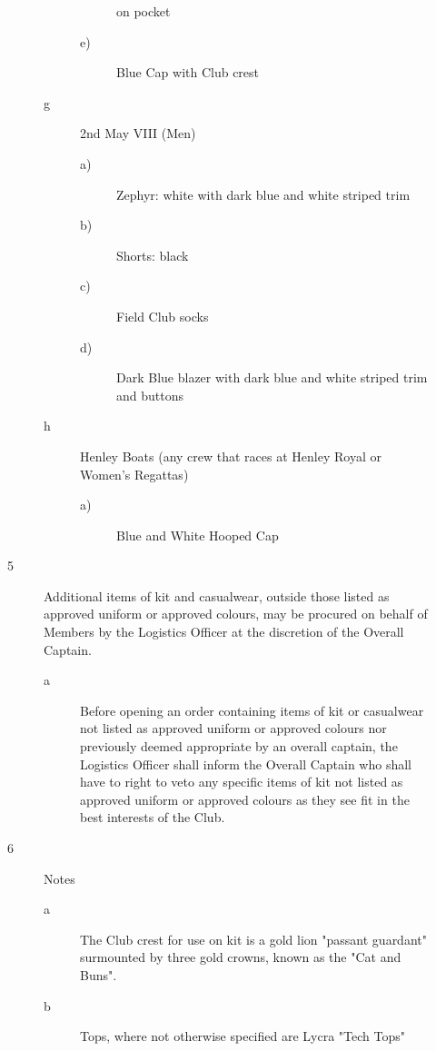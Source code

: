 \documentclass{article}
\begin{document}
\begin{description}
\begin{description}
\begin{description}
\begin{description}
				on pocket
				\item[e)] Blue Cap with Club crest
			\end{description}
			\item[g] 2nd May VIII (Men)
			\begin{description}
				\item[a)] Zephyr: white with dark blue and white striped trim
				\item[b)] Shorts: black
				\item[c)] Field Club socks
				\item[d)] Dark Blue blazer with dark blue and white striped trim and
				buttons
			\end{description}
			\item[h] Henley Boats (any crew that races at Henley Royal or Women's
			Regattas)
			\begin{description}
				\item[a)] Blue and White Hooped Cap
			\end{description}
		\end{description}
	
	\item[5] Additional items of kit and casualwear, outside those listed as approved
	uniform or approved colours, may be procured on behalf of Members by the
	Logistics Officer at the discretion of the Overall Captain.\\
	
	\begin{description}
		\item[a] Before opening an order containing items of kit or casualwear not
		listed as approved uniform or approved colours nor previously deemed
		appropriate by an overall captain, the Logistics Officer shall inform the
		Overall Captain who shall have to right to veto any specific items of
		kit not listed as approved uniform or approved colours as they see fit in
		the best interests of the Club.\\
	\end{description}
	\item[6] Notes
	\begin{description}
		\item[a] The Club crest for use on kit is a gold lion "passant guardant"
		surmounted by three gold crowns, known as the "Cat and Buns".\\
		
		\item[b] Tops, where not otherwise specified are Lycra "Tech Tops"\\
		

\end{description}
\end{description}
\end{description}
\end{document}
